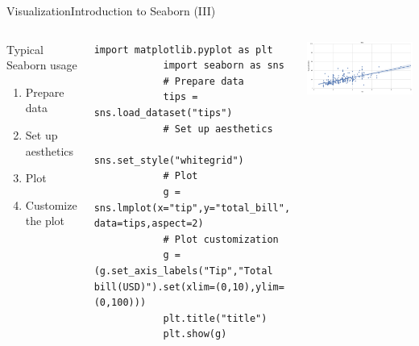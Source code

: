\documentclass[10pt,compress]{beamer} %
\begin{document}
\begin{frame}[fragile]{Visualization}{Introduction to Seaborn (III)}
	\begin{columns}
		\begin{block}{Typical Seaborn usage}
		\begin{enumerate}
			\item Prepare data
			\item Set up aesthetics
			\item Plot
			\item Customize the plot
		\end{enumerate}
	\end{block}


		\begin{exampleblock}{}
			\vspace{-0.2cm} 
			\begin{lstlisting}[basicstyle=\tiny]
			import matplotlib.pyplot as plt
			import seaborn as sns
			# Prepare data
			tips = sns.load_dataset("tips")
			# Set up aesthetics
			sns.set_style("whitegrid")
			# Plot
			g = sns.lmplot(x="tip",y="total_bill", data=tips,aspect=2)
			# Plot customization
			g = (g.set_axis_labels("Tip","Total bill(USD)").set(xlim=(0,10),ylim=(0,100)))
			plt.title("title")
			plt.show(g)
			\end{lstlisting}
			\vspace{-0.2cm} 
		\end{exampleblock}

		\includegraphics[width=\textwidth]{figs/sns-lm.png}\\
	\end{columns}
\end{frame}
\end{document}
